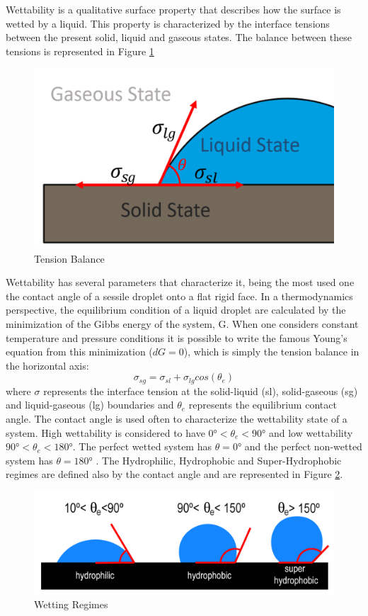 \par Wettability is a qualitative surface property that describes how the surface is wetted by a liquid. This property is characterized by the interface tensions between the present solid, liquid and gaseous states. The balance between these tensions is represented in Figure \ref{fig:tensao}
\begin{figure}[h]
\centering
\includegraphics[width=0.5\linewidth]{Figures/2.Chapter/tensao.PNG}
\caption{Tension Balance}
\label{fig:tensao}
\end{figure}
\par Wettability has several parameters that characterize it, being the most used one the contact angle of a sessile droplet onto a flat rigid face. In a thermodynamics perspective, the equilibrium condition of a liquid droplet are calculated by the minimization of the Gibbs energy of the system, G. When one considers constant temperature and pressure conditions it is possible to write the famous Young's equation \cite{young1805essay} from this minimization ($dG=0$), which is simply the tension balance in the horizontal axis:
\begin{equation}
\sigma_{sg}=\sigma_{sl}+\sigma_{lg}cos(\theta_e)
\end{equation}
where $\sigma$ represents the interface tension at the solid-liquid (sl), solid-gaseous (sg) and liquid-gaseous (lg) boundaries and $\theta_e$ represents the equilibrium contact angle. The contact angle is used often to characterize the wettability state of a system. High wettability is considered to have $0\si{\degree} <\theta_e<90\si{\degree} $ and low wettability $90\si{\degree}<\theta_e<180\si{\degree} $. The perfect wetted system has $\theta=0\si{\degree} $ and the perfect non-wetted system has $\theta=180\si{\degree} $ \cite{choi2011wettability}. The Hydrophilic, Hydrophobic and Super-Hydrophobic regimes are defined also by the contact angle and are represented in Figure \ref{fig:wet}.

\begin{figure}[h]
\centering
\includegraphics[width=0.7\linewidth]{Figures/2.Chapter/wet.png}
\caption{Wetting Regimes}
\label{fig:wet}
\end{figure}

